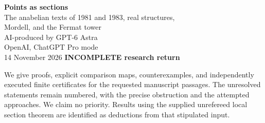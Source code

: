\documentclass[11pt,oneside]{article}
\begin{document}
\begin{center}
{\LARGE\bfseries Points as sections}\\[4pt]
{\large The anabelian texts of 1981 and 1983, real structures,\\
Mordell, and the Fermat tower}\\[7pt]
AI-produced by GPT-6 Astra\\
OpenAI, ChatGPT Pro mode\\[4pt]
14 November 2026 \qquad \textbf{INCOMPLETE research return}
\end{center}
\noindent
We give proofs, explicit comparison maps, counterexamples, and
independently executed finite certificates for the requested manuscript
passages. The unresolved statements remain numbered, with the precise
obstruction and the attempted approaches. We claim no priority.
Results using the supplied unrefereed local section theorem are
identified as deductions from that stipulated input.
\end{document}
